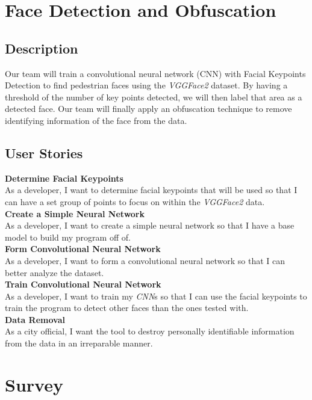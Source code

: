 \section{Face Detection and Obfuscation}

\subsection{Description}

Our team will train a convolutional neural network (CNN) with Facial Keypoints Detection to find pedestrian faces using the \textit{VGGFace2} dataset. By having a threshold of the number of key points detected, we will then label that area as a detected face. Our team will finally apply an obfuscation technique to remove identifying information of the face from the data.

\subsection{User Stories}

\textbf{Determine Facial Keypoints} \\
As a developer, I want to determine facial keypoints that will be used so that I can have a set group of points to focus on within the \textit{VGGFace2} data.
\\
\textbf{Create a Simple Neural Network} 
\\
As a developer, I want to create a simple neural network so that I have a base model to build my program off of.
\\
\textbf{Form Convolutional Neural Network}
\\
As a developer, I want to form a convolutional neural network so that I can better analyze the dataset.
\\
\textbf{Train Convolutional Neural Network}
\\
As a developer, I want to train my \textit{CNN}s so that I can use the facial keypoints to train the program to detect other faces than the ones tested with.
\\
\textbf{Data Removal}
\\
As a city official, I want the tool to destroy personally identifiable information from the data in an irreparable manner. 

\section{Survey}

